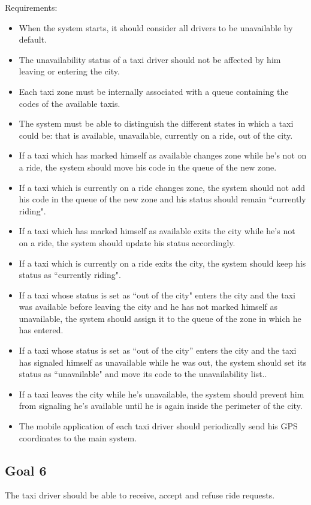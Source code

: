 Requirements:
\begin{itemize}
\item When the system starts, it should consider all drivers to be unavailable by default.
\item The unavailability status of a taxi driver should not be affected by him leaving or entering the city.
\item Each taxi zone must be internally associated with a queue containing the codes of the available taxis.
\item The system must be able to distinguish the different states in which a taxi could be: that is available, unavailable, currently on a ride, out of the city.
\item If a taxi which has marked himself as available changes zone while he's not on a ride, the system should move his code in the queue of the new zone.
\item If a taxi which is currently on a ride changes zone, the system should not add his code in the queue of the new zone and his status should remain ``currently riding".
\item If a taxi which has marked himself as available exits the city while he's not on a ride, the system should update his status accordingly.
\item If a taxi which is currently on a ride exits the city, the system should keep his status as ``currently riding". 
\item If a taxi whose status is set as ``out of the city" enters the city and the taxi was available before leaving the city and he has not marked himself as unavailable, the system should assign it to the queue of the zone in which he has entered.
\item If a taxi whose status is set as “out of the city” enters the city and the taxi has signaled himself as unavailable while he was out, the system should set its status as ``unavailable" and move its code to the unavailability list.. 
\item If a taxi leaves the city while he's unavailable, the system should prevent him from signaling he's available until he is again inside the perimeter of the city.
\item The mobile application of each taxi driver should periodically send his GPS coordinates to the main system. 
\end{itemize}


\subsection{Goal 6}
The taxi driver should be able to receive, accept and refuse ride requests.

